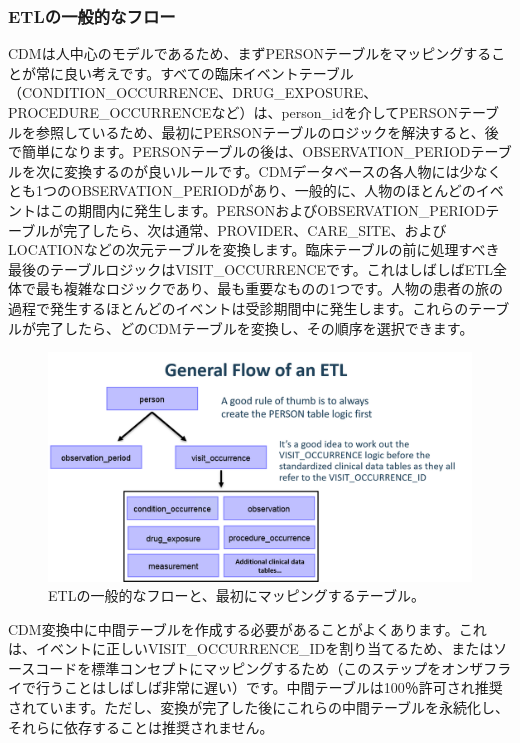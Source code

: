 \documentclass[
  11pt]{book}
\theoremstyle{definition}
\theoremstyle{definition}
\theoremstyle{definition}
\theoremstyle{definition}
\theoremstyle{remark}
\begin{document}
\subsubsection*{ETLの一般的なフロー}\label{etlux306eux4e00ux822cux7684ux306aux30d5ux30edux30fc}

CDMは人中心のモデルであるため、まずPERSONテーブルをマッピングすることが常に良い考えです。すべての臨床イベントテーブル（CONDITION\_OCCURRENCE、DRUG\_EXPOSURE、PROCEDURE\_OCCURRENCEなど）は、person\_idを介してPERSONテーブルを参照しているため、最初にPERSONテーブルのロジックを解決すると、後で簡単になります。PERSONテーブルの後は、OBSERVATION\_PERIODテーブルを次に変換するのが良いルールです。CDMデータベースの各人物には少なくとも1つのOBSERVATION\_PERIODがあり、一般的に、人物のほとんどのイベントはこの期間内に発生します。PERSONおよびOBSERVATION\_PERIODテーブルが完了したら、次は通常、PROVIDER、CARE\_SITE、およびLOCATIONなどの次元テーブルを変換します。臨床テーブルの前に処理すべき最後のテーブルロジックはVISIT\_OCCURRENCEです。これはしばしばETL全体で最も複雑なロジックであり、最も重要なものの1つです。人物の患者の旅の過程で発生するほとんどのイベントは受診期間中に発生します。これらのテーブルが完了したら、どのCDMテーブルを変換し、その順序を選択できます。

\begin{figure}

{\centering \includegraphics[width=1\linewidth]{images/ExtractTransformLoad/flowOfEtl} 

}

\caption{ETLの一般的なフローと、最初にマッピングするテーブル。}\label{fig:etlFlow}
\end{figure}

CDM変換中に中間テーブルを作成する必要があることがよくあります。これは、イベントに正しいVISIT\_OCCURRENCE\_IDを割り当てるため、またはソースコードを標準コンセプトにマッピングするため（このステップをオンザフライで行うことはしばしば非常に遅い）です。中間テーブルは100％許可され推奨されています。ただし、変換が完了した後にこれらの中間テーブルを永続化し、それらに依存することは推奨されません。
\end{document}
